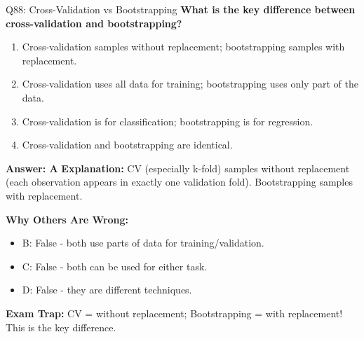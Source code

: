 \documentclass[8pt]{beamer}
\begin{document}
	\begin{frame}{Q88: Cross-Validation vs Bootstrapping}
		\fontsize{6.5}{7.5}\selectfont
		\textbf{What is the key difference between cross-validation and bootstrapping?}
		
		\begin{enumerate}
			\item Cross-validation samples without replacement; bootstrapping samples with replacement.
			\item Cross-validation uses all data for training; bootstrapping uses only part of the data.
			\item Cross-validation is for classification; bootstrapping is for regression.
			\item Cross-validation and bootstrapping are identical.
		\end{enumerate}
		
		\vspace{0.05cm}
		\textcolor{myblue}{\textbf{Answer: A}}
		\vspace{0.05cm}
		\textcolor{myblue}{\textbf{Explanation:}} CV (especially k-fold) samples without replacement (each observation appears in exactly one validation fold). Bootstrapping samples with replacement.
		
		\vspace{0.05cm}
		\textcolor{myred}{\textbf{Why Others Are Wrong:}}
		\begin{itemize}
			\item \textcolor{myred}{B:} False - both use parts of data for training/validation.
			\item \textcolor{myred}{C:} False - both can be used for either task.
			\item \textcolor{myred}{D:} False - they are different techniques.
		\end{itemize}
		
		\textcolor{myred}{\textbf{Exam Trap:}} CV = \textcolor{myblue}{without replacement}; Bootstrapping = \textcolor{myblue}{with replacement}! This is the key difference.
	\end{frame}
	
\end{document}
